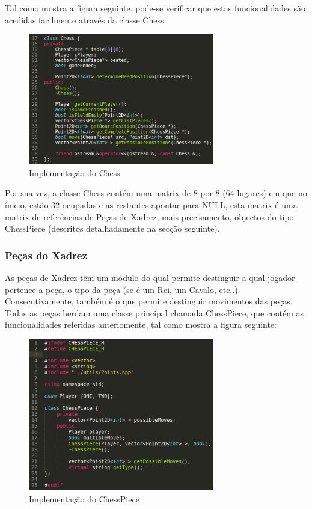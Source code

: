\documentclass[portugues,final]{revdetua}
\begin{document}
Tal como mostra a figura seguinte, pode-se verificar que estas funcionalidades são acedidas facilmente através da classe Chess.

\begin{figure}[H]
\centerline{\includegraphics[width=230pt]{images/chess.png}}
\caption{Implementação do Chess}
\label{img:complete}
\end{figure}

Por sua vez, a classe Chess contém uma matrix de 8 por 8 (64 lugares) em que no ínicio, estão 32 ocupadas e as restantes apontar para NULL, esta matrix é uma matrix de referências de Peças de Xadrez, mais precisamento, objectos do tipo ChessPiece (descritos detalhadamente na secção seguinte).

\subsubsection{Peças do Xadrez}

As peças de Xadrez têm um módulo do qual permite destinguir a qual jogador pertence a peça, o tipo da peça (se é um Rei, um Cavalo, etc..). Consecutivamente, também é o que permite destinguir movimentos das peças.\\

Todas as peças herdam uma classe principal chamada ChessPiece, que contém as funcionalidades referidas anteriomente, tal como mostra a figura seguinte:

\begin{figure}[H]
\centerline{\includegraphics[width=230pt]{images/chesspiece.png}}
\caption{Implementação do ChessPiece}
\label{img:complete}
\end{figure}
\end{document}
